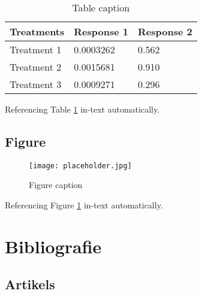 \documentclass[11pt,fleqn]{book} %
\begin{document}
\begin{table}[h]
\centering
\begin{tabular}{l l l}
\toprule
\textbf{Treatments} & \textbf{Response 1} & \textbf{Response 2}\\
\midrule
Treatment 1 & 0.0003262 & 0.562 \\
Treatment 2 & 0.0015681 & 0.910 \\
Treatment 3 & 0.0009271 & 0.296 \\
\bottomrule
\end{tabular}
\caption{Table caption}
\label{tab:example} %
\end{table}

Referencing Table \ref{tab:example} in-text automatically.


\section{Figure}

\begin{figure}[h]
\centering\texttt{[image: placeholder.jpg]}
\caption{Figure caption}
\label{fig:placeholder} %
\end{figure}

Referencing Figure \ref{fig:placeholder} in-text automatically.



\chapter*{Bibliografie}


\section*{Artikels}
\printbibliography[heading=bibempty,type=article]
\end{document}
